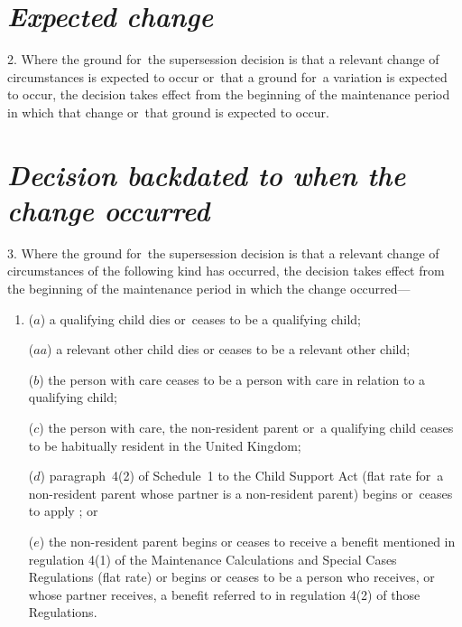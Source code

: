 \documentclass[12pt,a4paper]{article}
\begin{document}
\section*{\itshape Expected change}

2.  Where the ground for~the supersession decision is that a relevant change of circumstances is expected to occur or~that a ground for~a variation is expected to occur, the decision takes effect from the beginning of the maintenance period in which that change or~that ground is expected to occur.

\section*{\itshape Decision backdated to when the change occurred}

3.  Where the ground for~the supersession decision is that a relevant change of circumstances of the following kind has occurred, the decision takes effect from the beginning of the maintenance period in which the change occurred—
\begin{enumerate}\item[]
($a$) a qualifying child dies or~ceases to be a qualifying child;

($aa$) a relevant other child dies or ceases to be a relevant other child;

($b$) the person with care ceases to be a person with care in relation to a qualifying child;

($c$) the person with care, the non-resident parent or~a qualifying child ceases to be habitually resident in the United Kingdom; 

($d$) paragraph~4(2) of Schedule~1 to the Child Support Act (flat rate for~a non-resident parent whose partner is a non-resident parent) begins or~ceases to apply%
%
; or

($e$) the non-resident parent begins or ceases to receive a benefit mentioned in regulation 4(1) of the Maintenance Calculations and Special Cases Regulations (flat rate) or begins or ceases to be a person who receives, or whose partner receives, a benefit referred to in regulation 4(2) of those Regulations.
\end{enumerate}

\end{document}

